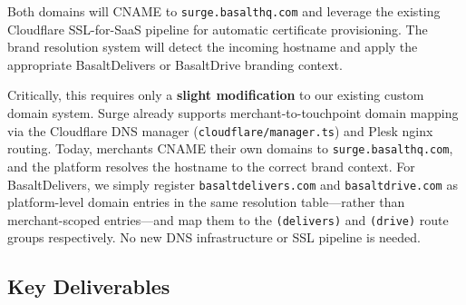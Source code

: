 \documentclass[11pt, letterpaper]{article}
\begin{document}
Both domains will CNAME to \texttt{surge.basalthq.com} and leverage the existing Cloudflare SSL-for-SaaS pipeline for automatic certificate provisioning. The brand resolution system will detect the incoming hostname and apply the appropriate BasaltDelivers or BasaltDrive branding context.

Critically, this requires only a \textbf{slight modification} to our existing custom domain system. Surge already supports merchant-to-touchpoint domain mapping via the Cloudflare DNS manager (\texttt{cloudflare/manager.ts}) and Plesk nginx routing. Today, merchants CNAME their own domains to \texttt{surge.basalthq.com}, and the platform resolves the hostname to the correct brand context. For BasaltDelivers, we simply register \texttt{basaltdelivers.com} and \texttt{basaltdrive.com} as platform-level domain entries in the same resolution table---rather than merchant-scoped entries---and map them to the \texttt{(delivers)} and \texttt{(drive)} route groups respectively. No new DNS infrastructure or SSL pipeline is needed.

\subsection{Key Deliverables}
\end{document}
